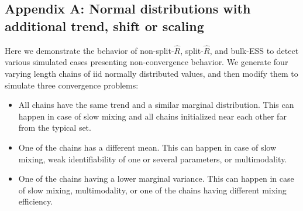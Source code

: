 \documentclass[american,]{article}
\providecommand{\tightlist}{%
  \setlength{\itemsep}{0pt}\setlength{\parskip}{0pt}}
\begin{document}



\hypertarget{AppendixD}{%
\subsection*{Appendix A: Normal distributions with additional trend,
shift or scaling}\label{AppendixD}}

Here we demonstrate the behavior of non-split-\(\widehat{R}\),
split-\(\widehat{R}\), and bulk-ESS to detect various simulated cases
presenting non-convergence behavior. We generate four varying length
chains of iid normally distributed values, and then modify them to
simulate three convergence problems:
\begin{itemize}
\tightlist
\item All chains have the same trend and a similar marginal
  distribution. This can happen in case of slow mixing and all chains
  initialized near each other far from the typical set.
\item One of the chains has a different mean. This can happen in case
  of slow mixing, weak identifiability of one or several parameters, or
  multimodality.
\item One of the chains having a lower marginal variance. This can
  happen in case of slow mixing, multimodality, or one of the chains
  having different mixing efficiency.
\end{itemize}

\end{document}
